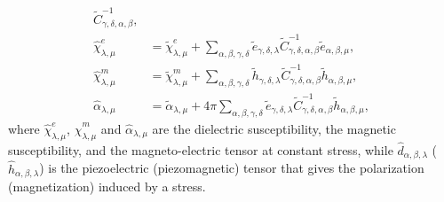 \documentclass[12pt,a4paper,twoside]{report}
\begin{document}
{\begin{align}
\tilde C^{-1}_{\gamma,\delta,\alpha,\beta}, \\
\hat \chi^e_{\lambda,\mu}&= \tilde \chi^e_{\lambda,\mu}
+
\sum_{\alpha,\beta,\gamma,\delta}\tilde e_{\gamma,\delta,\lambda}
\tilde C^{-1}_{\gamma,\delta,\alpha,\beta} \tilde e_{\alpha,\beta,\mu}, \\
\hat \chi^m_{\lambda,\mu}&= \tilde \chi^m_{\lambda,\mu}
+\sum_{\alpha,\beta,\gamma,\delta}\tilde h_{\gamma,\delta,\lambda}
\tilde C^{-1}_{\gamma,\delta,\alpha,\beta} \tilde h_{\alpha,\beta,\mu}, \\
\hat \alpha_{\lambda,\mu}&= \tilde \alpha_{\lambda,\mu}
+4 \pi \sum_{\alpha,\beta,\gamma,\delta}\tilde e_{\gamma,\delta,\lambda}
\tilde C^{-1}_{\gamma,\delta,\alpha,\beta} \tilde h_{\alpha,\beta,\mu},
\end{align}
where $\hat \chi^e_{\lambda,\mu}$, $\hat \chi^m_{\lambda,\mu}$ and
$\hat \alpha_{\lambda,\mu}$ are the dielectric susceptibility, the magnetic
susceptibility, 
and the magneto-electric tensor at constant stress, while 
$\hat d_{\alpha,\beta,\lambda}$ ($\hat h_{\alpha,\beta,\lambda}$)
is the piezoelectric (piezomagnetic) tensor that
gives the polarization (magnetization) induced by a stress. 

}
\end{document}
